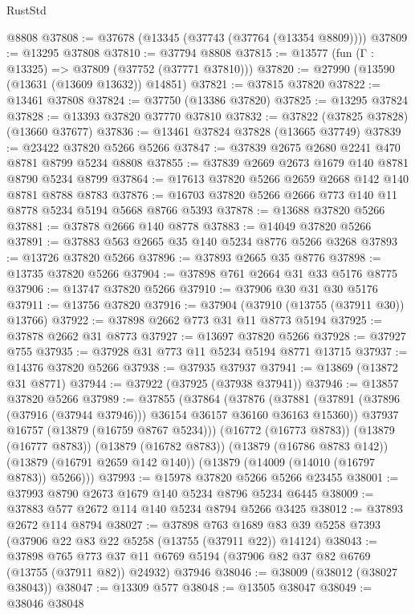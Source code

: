 \begin{lexlean}{RustStd}
\begin{coremodule}
    @8808
@37808 := @37678 (@13345 (@37743 (@37764 (@13354 @8809))))
@37809 := @13295 @37808
@37810 := @37794 @8808
@37815 := @13577 (fun (Γ : @13325) => @37809 (@37752 (@37771 @37810)))
@37820 := @27990 (@13590 (@13631 (@13609 @13632)) @14851)
@37821 := @37815 @37820
@37822 := @13461 @37808
@37824 := @37750 (@13386 @37820)
@37825 := @13295 @37824
@37828 := @13393 @37820 @37770 @37810
@37832 := @37822 (@37825 @37828) (@13660 @37677)
@37836 := @13461 @37824 @37828 (@13665 @37749)
@37839 := @23422 @37820 @5266 @5266
@37847 := @37839 @2675 @2680 @2241 @470 @8781 @8799 @5234 @8808
@37855 := @37839 @2669 @2673 @1679 @140 @8781 @8790 @5234 @8799
@37864 := @17613 @37820 @5266 @2659 @2668 @142 @140 @8781 @8788 @8783
@37876 := @16703 @37820 @5266 @2666 @773 @140 @11 @8778 @5234 @5194 @5668 @8766 @5393
@37878 := @13688 @37820 @5266
@37881 := @37878 @2666 @140 @8778
@37883 := @14049 @37820 @5266
@37891 := @37883 @563 @2665 @35 @140 @5234 @8776 @5266 @3268
@37893 := @13726 @37820 @5266
@37896 := @37893 @2665 @35 @8776
@37898 := @13735 @37820 @5266
@37904 := @37898 @761 @2664 @31 @33 @5176 @8775
@37906 := @13747 @37820 @5266
@37910 := @37906 @30 @31 @30 @5176
@37911 := @13756 @37820
@37916 := @37904 (@37910 (@13755 (@37911 @30)) @13766)
@37922 := @37898 @2662 @773 @31 @11 @8773 @5194
@37925 := @37878 @2662 @31 @8773
@37927 := @13697 @37820 @5266
@37928 := @37927 @755
@37935 := @37928 @31 @773 @11 @5234 @5194 @8771 @13715
@37937 := @14376 @37820 @5266
@37938 := @37935 @37937
@37941 := @13869 (@13872 @31 @8771)
@37944 := @37922 (@37925 (@37938 @37941))
@37946 := @13857 @37820 @5266
@37989 := @37855
    (@37864
      (@37876
        (@37881 (@37891 (@37896 (@37916 (@37944 @37946))) @36154 @36157 @36160 @36163 @15360))
        @37937
        @16757
        (@13879 (@16759 @8767 @5234)))
      (@16772 (@16773 @8783))
      (@13879 (@16777 @8783))
      (@13879 (@16782 @8783))
      (@13879 (@16786 @8783 @142))
      (@13879 (@16791 @2659 @142 @140))
      (@13879 (@14009 (@14010 (@16797 @8783)) @5266)))
@37993 := @15978 @37820 @5266 @5266 @23455
@38001 := @37993 @8790 @2673 @1679 @140 @5234 @8796 @5234 @6445
@38009 := @37883 @577 @2672 @114 @140 @5234 @8794 @5266 @3425
@38012 := @37893 @2672 @114 @8794
@38027 := @37898
    @763
    @1689
    @83
    @39
    @5258
    @7393
    (@37906 @22 @83 @22 @5258 (@13755 (@37911 @22)) @14124)
@38043 := @37898
    @765
    @773
    @37
    @11
    @6769
    @5194
    (@37906 @82 @37 @82 @6769 (@13755 (@37911 @82)) @24932)
    @37946
@38046 := @38009 (@38012 (@38027 @38043))
@38047 := @13309 @577
@38048 := @13505 @38047
@38049 := @38046 @38048

\end{coremodule}
\end{lexlean}

